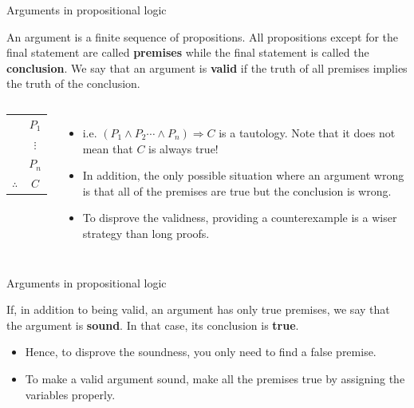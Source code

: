 \begin{frame}{Arguments in propositional logic}
    \begin{definition}
        An argument is a finite sequence of propositions. All propositions except for the final statement are called \textbf{premises} while the final statement is called the \textbf{conclusion}. We say that an argument is \textbf{valid} if the truth of all premises implies the truth of the conclusion.
    \end{definition}
    
    \begin{columns}[t,onlytextwidth]
        \begin{center}
            \begin{tabular}{cc}
                &$P_1$\\
                &$\vdots$\\
                &$P_n$\\\hline
                $\therefore$ & $C$
            \end{tabular}
        \end{center}

        \begin{itemize}
            \item 
            i.e. $(P_1\wedge P_2\cdots\wedge P_n)\Rightarrow C$ is a tautology. Note that it does not mean that $C$ is always true!
            \item
            In addition, the only possible situation where an argument wrong is that all of the premises are true but the conclusion is wrong.
            \item
            To disprove the validness, providing a counterexample is a wiser strategy than long proofs.
        \end{itemize}
        \end{columns}
\end{frame}

\begin{frame}{Arguments in propositional logic}
    \begin{definition}
        If, in addition to being valid, an argument has only true premises, we say that the argument is \textbf{sound}. In that case, its conclusion is \textbf{true}.
    \end{definition}
    \mypause
    \begin{itemize}
        \item Hence, to disprove the soundness, you only need to find a false premise.
        \item To make a valid argument sound, make all the premises true by assigning the variables properly.
    \end{itemize}
\end{frame}

